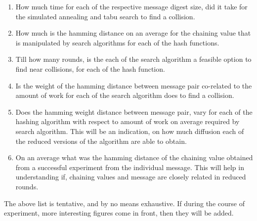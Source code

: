 \documentclass[12pt]{artikel3}                  %
\begin{document}
\begin{enumerate}
  \item How much time for each of the respective message digest size, did it take for the simulated
  annealing and tabu search to find a collision.
  \item How much is the hamming distance on an average for the chaining value that is manipulated by
  search algorithms for each of the hash functions.
  \item Till how many rounds, is the each of the search algorithm a feasible option to find near 
  collisions, for each of the hash function.
  \item Is the weight of the hamming distance between message pair co-related to the amount of work
  for each of the search algorithm does to find a collision.
  \item Does the hamming weight distance between message pair, vary for each of the hashing algorithm
    with respect to amount of work on average required by search algorithm. This will be an
    indication, on how much diffusion each of the reduced versions of the algorithm are able to obtain.
  \item On an average what was the hamming distance of the chaining value obtained from a successful
    experiment from the individual message. This will help in understanding if, chaining values and
    message are closely related in reduced rounds.
\end{enumerate}

The above list is tentative, and by no means exhaustive. If during the course of experiment, more 
interesting figures come in front, then they will be added.



\end{document}
